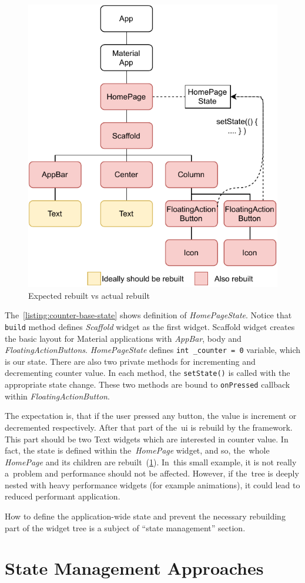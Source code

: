\begin{figure}[htp]
    \centering
    \includegraphics[width=0.40\linewidth]{img/flutter/counter-base-setState.pdf}
    \caption{Expected rebuilt vs actual rebuilt}
    \label{fig:counter-app-base-build}
\end{figure}

The~\cref{listing:counter-base-state} shows definition of \textit{HomePageState}. Notice that \verb|build| method defines \textit{Scaffold} widget as the first widget. Scaffold widget creates the basic layout for Material applications with \textit{AppBar}, body and \textit{FloatingActionButtons}. \textit{HomePageState} defines \verb|int _counter = 0| variable, which is our state. There are also two private methods for incrementing and decrementing counter value. In each method, the \verb|setState()| is called with the appropriate state change.  These two methods are bound to \verb|onPressed| callback within \textit{FloatingActionButton}. 

The expectation is, that if the user pressed any button, the value is increment or decremented respectively. After that part of the~\gls{ui} is rebuild by the framework. This part should be two Text widgets which are interested in counter value. In fact, the state is defined within the~\textit{HomePage} widget, and so, the~whole \textit{HomePage} and its children are rebuilt~(\cref{fig:counter-app-base-build}). In~this small example, it is not really a~problem and performance should not be affected. However, if the~tree is deeply nested with heavy performance widgets (for example animations), it could lead to reduced performant application. 

How to define the application-wide state and prevent the necessary rebuilding part of the widget tree is a subject of ``state management'' section.
\section{State Management Approaches}

